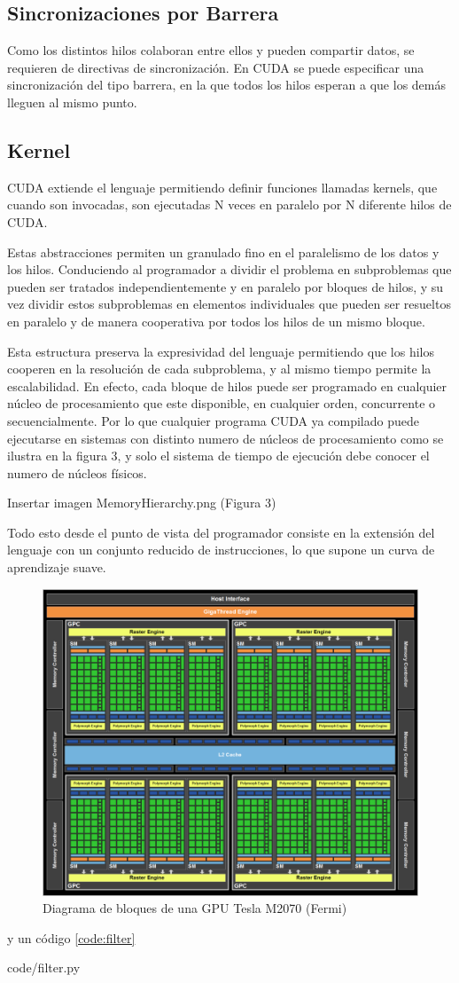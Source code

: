 \documentclass[twoside]{article}
\begin{document}
\subsection{Sincronizaciones por Barrera}

Como los distintos hilos colaboran entre ellos y pueden compartir datos, se requieren de directivas de sincronización. En CUDA se puede especificar una sincronización del tipo barrera, en la que todos los hilos esperan a que los demás lleguen al mismo punto.

\subsection{Kernel}

CUDA extiende el lenguaje permitiendo definir funciones llamadas kernels, que cuando son invocadas, son ejecutadas N veces en paralelo por N diferente hilos de CUDA.

Estas abstracciones permiten un granulado fino en el paralelismo de los datos y los hilos. Conduciendo al programador a dividir el problema en subproblemas que pueden ser tratados independientemente y en paralelo por bloques de hilos, y su vez dividir estos subproblemas en elementos individuales que pueden ser resueltos en paralelo y de manera cooperativa por todos los hilos de un mismo bloque.

Esta estructura preserva la expresividad del lenguaje permitiendo que los hilos cooperen en la resolución de cada subproblema, y al mismo tiempo permite la escalabilidad. En efecto, cada bloque de hilos puede ser programado en cualquier núcleo de procesamiento que este disponible, en cualquier orden, concurrente o secuencialmente. Por lo que cualquier programa CUDA ya compilado puede ejecutarse en sistemas con distinto numero de núcleos de procesamiento como se ilustra en la figura 3, y solo el sistema de tiempo de ejecución debe conocer el numero de núcleos físicos.

Insertar imagen MemoryHierarchy.png (Figura 3)

Todo esto desde el punto de vista del programador consiste en la extensión del lenguaje con un conjunto reducido de instrucciones, lo que supone un curva de aprendizaje suave.


\begin{figure}
	\includegraphics[width=.45\textwidth]{block_diagram_Fermi}
	\caption{\label{fig:Fermi} Diagrama de bloques de una GPU Tesla M2070 (Fermi)}
\end{figure}

y un código \ref{code:filter}

%
   {code/filter.py}



\end{document}
